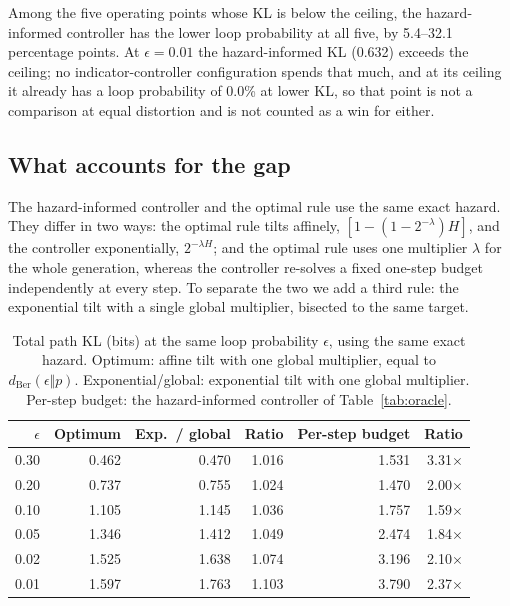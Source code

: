 \documentclass[11pt]{article}
\begin{document}
Among the five operating points whose KL is below the ceiling, the hazard-informed controller has the lower loop probability at all five, by 5.4--32.1 percentage points. At $\epsilon{=}0.01$ the hazard-informed KL (0.632) exceeds the ceiling; no indicator-controller configuration spends that much, and at its ceiling it already has a loop probability of 0.0\% at lower KL, so that point is not a comparison at equal distortion and is not counted as a win for either.

\subsection{What accounts for the gap}
\label{ssec:gap}
The hazard-informed controller and the optimal rule use the same exact hazard. They differ in two ways: the optimal rule tilts affinely, $[1-(1-2^{-\lambda})H]$, and the controller exponentially, $2^{-\lambda H}$; and the optimal rule uses one multiplier $\lambda$ for the whole generation, whereas the controller re-solves a fixed one-step budget independently at every step. To separate the two we add a third rule: the exponential tilt with a single global multiplier, bisected to the same target.

\begin{table}[ht]
\centering
\caption{Total path KL (bits) at the same loop probability $\epsilon$, using the same exact hazard. Optimum: affine tilt with one global multiplier, equal to $d_{\mathrm{Ber}}(\epsilon\Vert p)$. Exponential/global: exponential tilt with one global multiplier. Per-step budget: the hazard-informed controller of Table~\ref{tab:oracle}.}
\label{tab:ablation}
\begin{tabular}{@{}rrrrrr@{}}
\toprule
$\epsilon$ & Optimum & Exp.\ / global & Ratio & Per-step budget & Ratio \\
\midrule
0.30 & 0.462 & 0.470 & 1.016 & 1.531 & 3.31$\times$ \\
0.20 & 0.737 & 0.755 & 1.024 & 1.470 & 2.00$\times$ \\
0.10 & 1.105 & 1.145 & 1.036 & 1.757 & 1.59$\times$ \\
0.05 & 1.346 & 1.412 & 1.049 & 2.474 & 1.84$\times$ \\
0.02 & 1.525 & 1.638 & 1.074 & 3.196 & 2.10$\times$ \\
0.01 & 1.597 & 1.763 & 1.103 & 3.790 & 2.37$\times$ \\
\bottomrule
\end{tabular}
\end{table}
\end{document}
